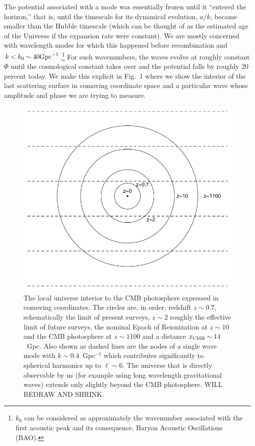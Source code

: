 \documentclass[psfig,11pt]{article}
\begin{document}
The potential associated with a mode was essentially frozen until it ``entered the horizon,'' that is, until the timescale for its dynamical evolution, $a/k$, became smaller than the Hubble timescale (which can be thought of as the estimated age of the Universe if the expansion rate were constant). We are mostly concerned with wavelength modes for which this happened before recombination and $k<k_0\sim40{\rm Gpc}^{-1}$.\footnote{$k_0$ can be considered as approximately the wavenumber associated with the first acoustic peak and its consequence, Baryon Acoustic Oscillations (BAO).} For such wavenumbers, the waves evolve at roughly constant $\Phi$ until the cosmological constant takes over and the potential falls by roughly 20 percent today. We make this explicit in Fig.~1 where we show the interior of the last scattering surface in comoving coordinate space and a particular wave whose amplitude and phase we are trying to measure.
\begin{figure}[t]
\centering
\includegraphics{nsffig.pdf}
\caption{The local universe interior to the CMB photosphere expressed in comoving coordinates. The circles are, in order, redshift $z\sim0.7$, schematically the limit of present surveys, $z\sim2$ roughly the effective limit of future surveys, the nominal Epoch of Reionization at $z\sim10$ and the CMB photosphere at $z\sim1100$ and a distance $x_{\rm CMB}\sim14$~Gpc. Also shown as dashed lines are the nodes of a single wave mode with $k\sim0.4$~Gpc$^{-1}$ which contributes significantly to spherical harmonics up to $\ell\sim6$. The universe that is directly observable by us (for example using long wavelength gravitational waves) extends only slightly beyond the CMB photosphere. WILL REDRAW AND SHRINK.}
\end{figure}
\end{document}
